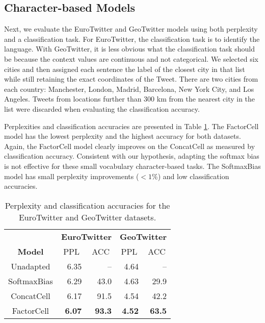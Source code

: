 \subsection{Character-based Models}

Next, we evaluate the EuroTwitter and GeoTwitter models using both perplexity and a classification task. For EuroTwitter, the classification task is to identify the language. With GeoTwitter, it is less obvious what the classification task should be because the context values are continuous and not categorical. We selected six cities and then assigned each sentence the label of the closest city in that list while still retaining the exact coordinates of the Tweet. There are two cities from each country: Manchester, London, Madrid, Barcelona, New York City, and Los Angeles. Tweets from locations further than 300 km from the nearest city in the list were discarded when evaluating the classification accuracy.

Perplexities and classification accuracies are presented in Table \ref{table:twitter_results}. The FactorCell model has the lowest perplexity and the highest accuracy for both datasets. Again, the FactorCell model clearly improves on the ConcatCell as measured by classification accuracy. Consistent with our hypothesis, adapting the softmax bias is not effective for these small vocabulary character-based tasks. The SoftmaxBias model has small perplexity improvements ($<1\%$) and low classification accuracies.

\begin{table}[ht]
\centering
\begin{tabular}{c|rr|rr}
  & \multicolumn{2}{c|}{\textbf{EuroTwitter}} & \multicolumn{2}{c}{\textbf{GeoTwitter}} \\
\textbf{Model} & \multicolumn{1}{c}{PPL} & \multicolumn{1}{c|}{ACC} & \multicolumn{1}{c}{PPL} & \multicolumn{1}{c}{ACC} \\ \hline
Unadapted & 6.35 & -- & 4.64 & -- \\
SoftmaxBias & 6.29 & 43.0 & 4.63 & 29.9 \\
ConcatCell & 6.17 & 91.5 & 4.54 & 42.2 \\
FactorCell & \textbf{6.07} & \textbf{93.3} & \textbf{4.52} & \textbf{63.5} \\
\end{tabular}
\caption{Perplexity and classification accuracies for the EuroTwitter and GeoTwitter datasets.}
\label{table:twitter_results}
\end{table}

